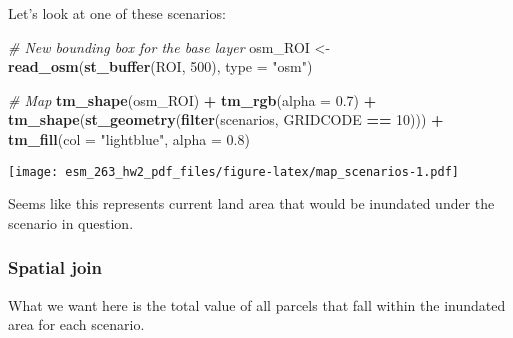 \documentclass[
]{article}
\newenvironment{Shaded}{\begin{snugshade}}{\end{snugshade}}
\newcommand{\CommentTok}[1]{\textcolor[rgb]{0.56,0.35,0.01}{\textit{#1}}}
\newcommand{\DataTypeTok}[1]{\textcolor[rgb]{0.13,0.29,0.53}{#1}}
\newcommand{\DecValTok}[1]{\textcolor[rgb]{0.00,0.00,0.81}{#1}}
\newcommand{\FloatTok}[1]{\textcolor[rgb]{0.00,0.00,0.81}{#1}}
\newcommand{\KeywordTok}[1]{\textcolor[rgb]{0.13,0.29,0.53}{\textbf{#1}}}
\newcommand{\NormalTok}[1]{#1}
\newcommand{\OperatorTok}[1]{\textcolor[rgb]{0.81,0.36,0.00}{\textbf{#1}}}
\newcommand{\StringTok}[1]{\textcolor[rgb]{0.31,0.60,0.02}{#1}}
\begin{document}
Let's look at one of these scenarios:

\begin{Shaded}
\begin{Highlighting}[]
\CommentTok{# New bounding box for the base layer}
\NormalTok{osm_ROI <-}\StringTok{ }\KeywordTok{read_osm}\NormalTok{(}\KeywordTok{st_buffer}\NormalTok{(ROI, }\DecValTok{500}\NormalTok{), }\DataTypeTok{type =} \StringTok{"osm"}\NormalTok{)}

\CommentTok{# Map}
\KeywordTok{tm_shape}\NormalTok{(osm_ROI) }\OperatorTok{+}
\StringTok{  }\KeywordTok{tm_rgb}\NormalTok{(}\DataTypeTok{alpha =} \FloatTok{0.7}\NormalTok{) }\OperatorTok{+}
\StringTok{  }\KeywordTok{tm_shape}\NormalTok{(}\KeywordTok{st_geometry}\NormalTok{(}\KeywordTok{filter}\NormalTok{(scenarios, GRIDCODE }\OperatorTok{==}\StringTok{ }\DecValTok{10}\NormalTok{))) }\OperatorTok{+}
\StringTok{  }\KeywordTok{tm_fill}\NormalTok{(}\DataTypeTok{col =} \StringTok{"lightblue"}\NormalTok{, }\DataTypeTok{alpha =} \FloatTok{0.8}\NormalTok{)}
\end{Highlighting}
\end{Shaded}

\texttt{[image: esm\_263\_hw2\_pdf\_files/figure-latex/map\_scenarios-1.pdf]}

Seems like this represents current land area that would be inundated
under the scenario in question.

\hypertarget{spatial-join}{%
\subsubsection{Spatial join}\label{spatial-join}}

What we want here is the total value of all parcels that fall within the
inundated area for each scenario.
\end{document}
